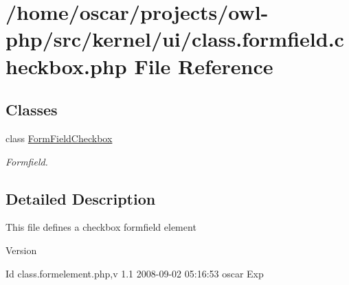 \section{/home/oscar/projects/owl-\/php/src/kernel/ui/class.formfield.checkbox.php File Reference}
\label{class_8formfield_8checkbox_8php}
\subsection*{Classes}
\begin{DoxyCompactItemize}
\item 
class \hyperlink{classFormFieldCheckbox}{FormFieldCheckbox}
\begin{DoxyCompactList}\small\item\em Formfield. \item\end{DoxyCompactList}\end{DoxyCompactItemize}


\subsection{Detailed Description}
This file defines a checkbox formfield element \begin{DoxyVersion}{Version}

\end{DoxyVersion}
\begin{DoxyParagraph}{Id}
class.formelement.php,v 1.1 2008-\/09-\/02 05:16:53 oscar Exp 
\end{DoxyParagraph}
